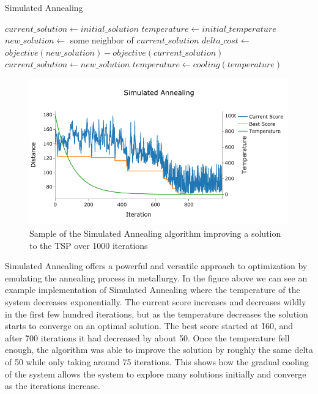 \documentclass{article}
\begin{document}
\begin{algorithm}[!h]
    \DontPrintSemicolon
    \caption{Simulated Annealing}
    \label{alg:anneal}
    \KwResult{}

    $current\_solution\gets initial\_solution$\;
    $temperature \gets initial\_temperature$\;
    {
        $new\_solution \gets$ some neighbor of $current\_solution$\;
        $delta\_cost \gets$ $objective(new\_solution) - objective(current\_solution)$\;
        {
            $current\_solution\gets new\_solution$\;
        }
        $temperature\gets cooling(temperature)$\;
    }
\end{algorithm}

\begin{figure}[h]
    \centering
    \includegraphics[width=1\textwidth,keepaspectratio]{Images/SA.png}
    \caption{Sample of the Simulated Annealing algorithm improving a solution to the TSP over 1000 iterations}
    \label{fig:bandb}
\end{figure}

\noindent Simulated Annealing offers a powerful and versatile approach to optimization by emulating the annealing process in metallurgy. In the figure above we can see an example implementation of Simulated Annealing where the temperature of the system decreases exponentially. The current score increases and decreases wildly in the first few hundred iterations, but as the temperature decreases the solution starts to converge on an optimal solution. The best score started at \~160, and after \~700 iterations it had decreased by about 50. Once the temperature fell enough, the algorithm was able to improve the solution by roughly the same delta of 50 while only taking around 75 iterations. This shows how the gradual cooling of the system allows the system to explore many solutions initially and converge as the iterations increase.
\end{document}
